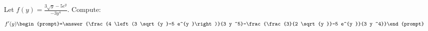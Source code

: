 \documentclass{ximera}
\author{Bart Snapp}
\begin{document}
\begin{exercise}
Let $f(y) = \frac{ 3 \sqrt{y }-5 e^{y }}{-3 y ^4}$. Compute:
\[
f'(y)
\begin{prompt}=\answer{\frac{4 \left(3 \sqrt{y }-5 e^{y }\right)}{3 y ^5}-\frac{\frac{3}{2 \sqrt{y }}-5 e^{y }}{3 y ^4}}\end{prompt}
\]
\end{exercise}
\end{document}
